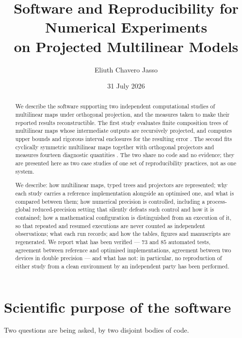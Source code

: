 \documentclass[11pt]{amsart}
\title[Software and reproducibility for projected multilinear models]{Software and Reproducibility for Numerical Experiments\\ on Projected Multilinear Models}
\author{Eliuth Chavero Jasso}
\date{31 July 2026}
\theoremstyle{remark}
\begin{document}
\maketitle

\begin{abstract}
We describe the software supporting two independent computational studies of multilinear
maps under orthogonal projection, and the measures taken to make their reported results
reconstructible. The first study evaluates finite composition trees of multilinear maps
whose intermediate outputs are recursively projected, and computes upper bounds and
rigorous interval enclosures for the resulting error \cite{ChaveroJassoTrees}. The second
fits cyclically symmetric multilinear maps together with orthogonal projectors and measures
fourteen diagnostic quantities \cite{ChaveroJassoNumerical}. The two share no code and no
evidence; they are presented here as two case studies of one set of reproducibility
practices, not as one system.

We describe: how multilinear maps, typed trees and projectors are represented; why each
study carries a reference implementation alongside an optimised one, and what is compared
between them; how numerical precision is controlled, including a process-global
reduced-precision setting that silently defeats such control and how it is contained; how a
mathematical configuration is distinguished from an execution of it, so that repeated and
resumed executions are never counted as independent observations; what each run records;
and how the tables, figures and manuscripts are regenerated. We report what has been
verified --- $73$ and $85$ automated tests, agreement between reference and optimised
implementations, agreement between two devices in double precision --- and what has not:
in particular, no reproduction of either study from a clean environment by an independent
party has been performed.
\end{abstract}


\section{Scientific purpose of the software}
\label{sec:purpose}

Two questions are being asked, by two disjoint bodies of code.
\end{document}
